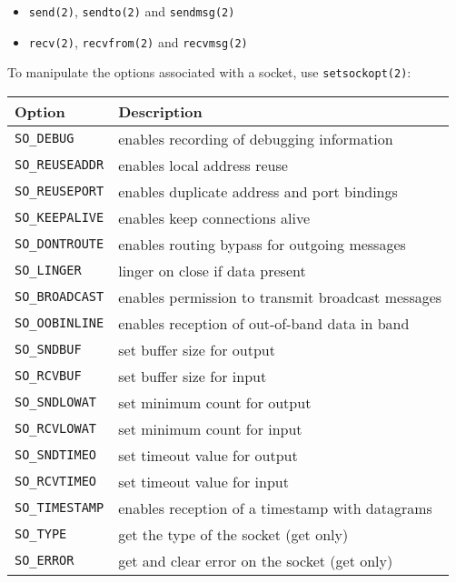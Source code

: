 \documentclass[xga]{xdvislides}
\begin{document}
\begin{itemize}
	\item {\tt send(2)}, {\tt sendto(2)} and {\tt sendmsg(2)}
	\item {\tt recv(2)}, {\tt recvfrom(2)} and {\tt recvmsg(2)}
\end{itemize}
To manipulate the options associated with a socket, use {\tt setsockopt(2)}:
\small
\begin{tabular}{| l | l |}
	\hline
	{\bf Option}		&	{\bf Description} \\
	\hline
	{\tt SO\_DEBUG}		&	enables recording of debugging information \\
	{\tt SO\_REUSEADDR}	&	enables local address reuse \\
	{\tt SO\_REUSEPORT}	&	enables duplicate address and port bindings \\
	{\tt SO\_KEEPALIVE}	&	enables keep connections alive\\
	{\tt SO\_DONTROUTE}	&	enables routing bypass for outgoing messages\\
	{\tt SO\_LINGER}	&	linger on close if data present\\
	{\tt SO\_BROADCAST}	&	enables permission to transmit broadcast messages\\
	{\tt SO\_OOBINLINE}	&	enables reception of out-of-band data in band\\
	{\tt SO\_SNDBUF}	&	set buffer size for output\\
	{\tt SO\_RCVBUF}	&	set buffer size for input\\
	{\tt SO\_SNDLOWAT}	&	set minimum count for output\\
	{\tt SO\_RCVLOWAT}	&	set minimum count for input\\
	{\tt SO\_SNDTIMEO}	&	set timeout value for output\\
	{\tt SO\_RCVTIMEO}	&	set timeout value for input\\
	{\tt SO\_TIMESTAMP}	&	enables reception of a timestamp with datagrams\\
	{\tt SO\_TYPE}		&	get the type of the socket (get only)\\
	{\tt SO\_ERROR}		&	get and clear error on the socket (get only)\\
	\hline
\end{tabular}
\Normalsize

%
%
%
\end{document}
